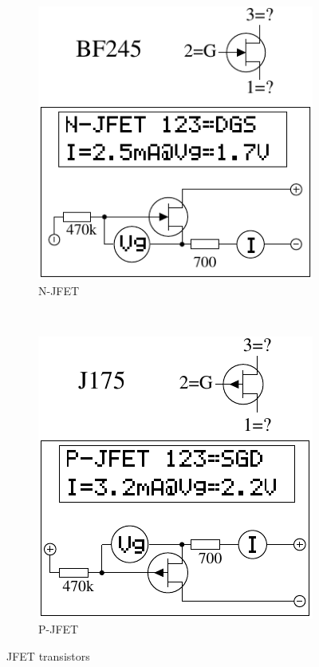 \begin{figure}[H]
  \begin{subfigure}[b]{.5\textwidth}
    \centering
    \includegraphics[width=1.\textwidth]{../FIG/JFET_BF245.pdf}
    \caption{N-JFET}
    \label{fig:N-JFET}
  \end{subfigure}
  ~
  \begin{subfigure}[b]{.5\textwidth}
    \centering
    \includegraphics[width=1.\textwidth]{../FIG/JFET_J175.pdf}
    \caption{P-JFET}
    \label{fig:P-JFET}
  \end{subfigure}
  \caption{JFET transistors}
\end{figure}




